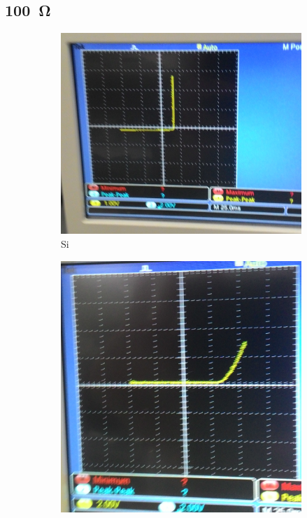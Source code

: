 \documentclass[12pt, a4paper]{article}
\begin{document}
\subsection{\SI{100}\ohm}
\begin{figure}[H]
  \centering
  \begin{subfigure}[b]{0.5\textwidth}
    \includegraphics[width=1\textwidth]{img/P4.jpg}
    \caption{Si}
  \end{subfigure}
  \begin{subfigure}[b]{0.5\textwidth}
    \includegraphics[width=1\textwidth]{img/P5.jpg}

\end{subfigure}
\end{figure}
\end{document}
